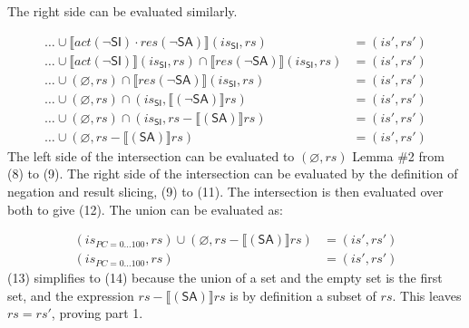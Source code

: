 \documentclass[12pt, letterpaper]{article}
\let\emptyset\varnothing
\newcommand\interp[1]{\llbracket #1 \rrbracket}
\begin{document}
     The right side can be evaluated similarly.
 \par\nobreak
 {\small
 \begin{align}
     \ldots \cup %
     \interp{ \mathit{act}(\neg\mathsf{SI}) \cdot
      \mathit{res}(\neg\mathsf{SA}) } (\mathit{is_{\mathsf{SI}}}, \mathit{rs})
     &=
     (\mathit{is}', \mathit{rs}')
     \\
     \ldots \cup %
     \interp{ \mathit{act}(\neg\mathsf{SI}) } (\mathit{is_{\mathsf{SI}}}, \mathit{rs}) \cap
     \interp{ \mathit{res}(\neg\mathsf{SA}) } (\mathit{is_{\mathsf{SI}}}, \mathit{rs})
     &=
     (\mathit{is}', \mathit{rs}')
     \\
     \ldots \cup 
     (\emptyset, \mathit{rs}) \cap
     \interp{ \mathit{res}(\neg\mathsf{SA}) } (\mathit{is_{\mathsf{SI}}}, \mathit{rs})
     &=
     (\mathit{is}', \mathit{rs}')
     \\ %
     \ldots \cup 
     (\emptyset, \mathit{rs}) \cap
     (\mathit{is_{\mathsf{SI}}}, \interp{ (\neg\mathsf{SA}) } \mathit{rs})
     &=
     (\mathit{is}', \mathit{rs}')
     \\
     \ldots \cup 
     (\emptyset, \mathit{rs}) \cap
     (\mathit{is_{\mathsf{SI}}}, \mathit{rs} - \interp{ (\mathsf{SA}) } \mathit{rs})
     &=
     (\mathit{is}', \mathit{rs}') %
     \\
     \ldots \cup 
     (\emptyset, \mathit{rs} - \interp{ (\mathsf{SA}) } \mathit{rs})
     &=
     (\mathit{is}', \mathit{rs}')
 \end{align}
 }
     The left side of the intersection can be evaluated to $(\emptyset, \mathit{rs})$ Lemma \#2 from (8) to (9). The right side of the intersection can be evaluated by the definition of negation and result slicing, (9) to (11).  The intersection is then evaluated over both to give (12).  The union can be evaluated as:
 \par\nobreak
 {\small
 \begin{align}
     (\mathit{is_{PC=0\ldots100}}, \mathit{rs}) \cup 
     (\emptyset, \mathit{rs} - \interp{ (\mathsf{SA}) } \mathit{rs})
     &=
     (\mathit{is}', \mathit{rs}')
     \\
     (\mathit{is_{PC=0\ldots100}}, \mathit{rs})
     &=
     (\mathit{is}', \mathit{rs}')
 \end{align}
 } 
     (13) simplifies to (14) because the union of a set and the empty set is the first set, and the expression $\mathit{rs} - \interp{ (\mathsf{SA}) } \mathit{rs}$ is by definition a subset of $\mathit{rs}$.  This leaves $\mathit{rs} = \mathit{rs}'$, proving part 1. 
\end{document}
